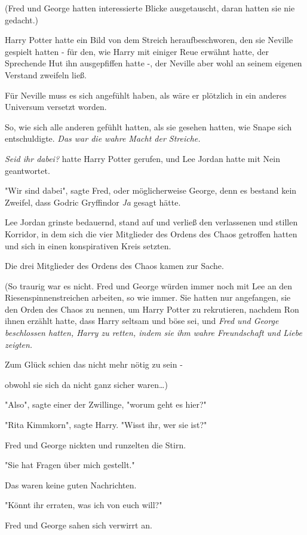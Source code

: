 {(Fred und George hatten interessierte Blicke ausgetauscht, daran hatten sie nie gedacht.)

Harry Potter hatte ein Bild von dem Streich heraufbeschworen, den sie Neville gespielt hatten - für den, wie Harry mit einiger Reue erwähnt hatte, der Sprechende Hut ihn ausgepfiffen hatte -, der Neville aber wohl an seinem eigenen Verstand zweifeln ließ.

Für Neville muss es sich angefühlt haben, als wäre er plötzlich in ein anderes Universum versetzt worden.

So, wie sich alle anderen gefühlt hatten, als sie gesehen hatten, wie Snape sich entschuldigte. \emph{Das war die wahre Macht der Streiche.}

\emph{Seid ihr dabei?} hatte Harry Potter gerufen, und Lee Jordan hatte mit Nein geantwortet.

"Wir sind dabei", sagte Fred, oder möglicherweise George, denn es bestand kein Zweifel, dass Godric Gryffindor \emph{Ja} gesagt hätte.

Lee Jordan grinste bedauernd, stand auf und verließ den verlassenen und stillen Korridor, in dem sich die vier Mitglieder des Ordens des Chaos getroffen hatten und sich in einen konspirativen Kreis setzten.

Die drei Mitglieder des Ordens des Chaos kamen zur Sache.

(So traurig war es nicht. Fred und George würden immer noch mit Lee an den Riesenspinnenstreichen arbeiten, so wie immer. Sie hatten nur angefangen, sie den Orden des Chaos zu nennen, um Harry Potter zu rekrutieren, nachdem Ron ihnen erzählt hatte, dass Harry seltsam und böse sei, und \emph{Fred und George beschlossen hatten, Harry zu retten, indem sie ihm wahre Freundschaft und Liebe zeigten.}

Zum Glück schien das nicht mehr nötig zu sein -

obwohl sie sich da nicht ganz sicher waren…)

"Also", sagte einer der Zwillinge, "worum geht es hier?"

"Rita Kimmkorn", sagte Harry. "Wisst ihr, wer sie ist?"

Fred und George nickten und runzelten die Stirn.

"Sie hat Fragen über mich gestellt."

Das waren keine guten Nachrichten.

"Könnt ihr erraten, was ich von euch will?"

Fred und George sahen sich verwirrt an.

}
